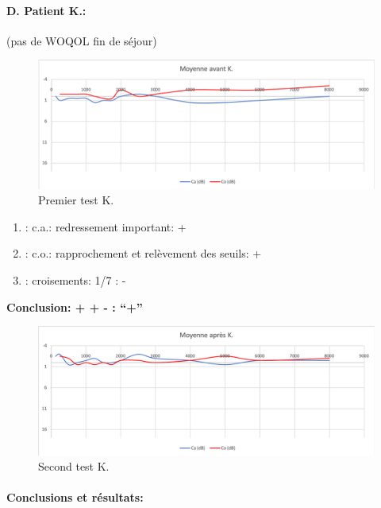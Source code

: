                 
\paragraph{D. Patient K.:}

  (pas de WOQOL fin de séjour)

        \begin{figure}
\centering
\includegraphics[width=0.7\linewidth]{images/graphiques/kad_pre.png}
\caption[Moyenne OG+OD]{Premier test K.}
       
\end{figure}
	\begin{enumerate}
 		
 		\item : c.a.: redressement important: +
                
 		\item : c.o.: rapprochement et relèvement des seuils: +
 		\item : croisements: 1/7 :  -
                  
                \end{enumerate}

                \textbf{  Conclusion:  + + -       : ``+''}

                 \begin{figure}
\centering
\includegraphics[width=0.7\linewidth]{images/graphiques/kad_post.png}
\caption[Moyenne OG+OD]{Second test K.}
       
\end{figure}
          
\paragraph{ Conclusions et résultats:}

